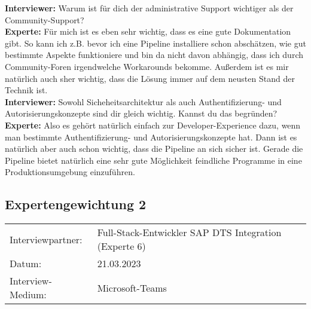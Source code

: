 \begin{linenumbers}
            \textbf{Interviewer:} Warum ist für dich der administrative Support wichtiger als der Community-Support?\\
            \textbf{Experte:} Für mich ist es eben sehr wichtig, dass es eine gute Dokumentation gibt. So kann ich z.B. bevor ich eine Pipeline installiere schon abschätzen, wie gut bestimmte Aspekte funktioniere und bin da nicht davon abhängig, dass ich durch Community-Foren irgendwelche Workarounds bekomme. Außerdem ist es mir natürlich auch sher wichtig, dass die Lösung immer auf dem neusten Stand der Technik ist.\\
            \textbf{Interviewer:} Sowohl Sicheheitsarchitektur als auch Authentifizierung- und Autorisierungskonzepte sind dir gleich wichtig. Kannst du das begründen?\\
            \textbf{Experte:} Also es gehört natürlich einfach zur Developer-Experience dazu, wenn man bestimmte Authentifizierung- und Autorisierungskonzepte hat. Dann ist es natürlich aber auch schon wichtig, dass die Pipeline an sich sicher ist. Gerade die Pipeline bietet natürlich eine sehr gute Möglichkeit feindliche Programme in eine Produktionsumgebung einzuführen.\\
    \end{linenumbers}
    

    
    \newpage
    \subsection{Expertengewichtung 2}
            \begin{tabular}{ l l }
        Interviewpartner: & Full-Stack-Entwickler SAP DTS Integration (Experte 6)\\
        Datum: & 21.03.2023\\
        Interview-Medium: & Microsoft-Teams\\
\end{tabular}
\begin{center}
    \begin{figure}[H]
        \centering
        \label{fig:CEA}
    \end{figure}	
\end{center}
\begin{center}
    \begin{figure}[H]
        \centering
        \label{fig:CEA}
    \end{figure}	
\end{center}

